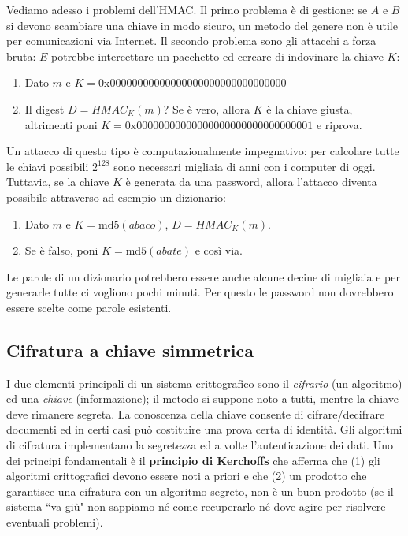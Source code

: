 Vediamo adesso i problemi dell'HMAC. Il primo problema è di gestione: se $A$ e $B$ si devono scambiare una chiave in modo sicuro, un metodo del genere non è utile per comunicazioni via Internet. Il secondo problema sono gli attacchi a forza bruta: $E$ potrebbe intercettare un pacchetto ed cercare di indovinare la chiave $K$:
\begin{enumerate}
	\item Dato $m$ e $K=0\text{x}00000000000000000000000000000000$
	\item Il digest $D=HMAC_K(m)$? Se è vero, allora $K$ è la chiave giusta, altrimenti poni $K=0\text{x}00000000000000000000000000000001$ e riprova.
\end{enumerate}
Un attacco di questo tipo è computazionalmente impegnativo: per calcolare tutte le chiavi possibili $2^{128}$ sono necessari migliaia di anni con i computer di oggi. Tuttavia, se la chiave $K$ è generata da una password, allora l'attacco diventa possibile attraverso ad esempio un dizionario:
\begin{enumerate}
	\item Dato $m$ e $K=\text{md5}(abaco)$, $D=HMAC_K(m)$.
	\item Se è falso, poni $K=\text{md5}(abate)$ e così via.
\end{enumerate}
Le parole di un dizionario potrebbero essere anche alcune decine di migliaia e per generarle tutte ci vogliono pochi minuti. Per questo le password non dovrebbero essere scelte come parole esistenti.

\subsection{Cifratura a chiave simmetrica}
I due elementi principali di un sistema crittografico sono il \textit{cifrario} (un algoritmo) ed una \textit{chiave} (informazione); il metodo si suppone noto a tutti, mentre la chiave deve rimanere segreta. La conoscenza della chiave consente di cifrare/decifrare documenti ed in certi casi può costituire una prova certa di identità. Gli algoritmi di cifratura implementano la segretezza ed a volte l'autenticazione dei dati. Uno dei principi fondamentali è il \textbf{principio di Kerchoffs} che afferma che (1) gli algoritmi crittografici devono essere noti a priori e che (2) un prodotto che garantisce una cifratura con un algoritmo segreto, non è un buon prodotto (se il sistema \textquotedblleft va giù" non sappiamo né come recuperarlo né dove agire per risolvere eventuali problemi).

